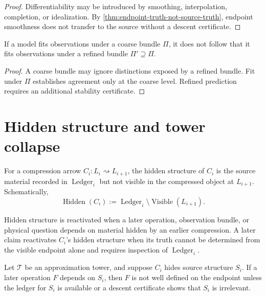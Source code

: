 \begin{proof}
Differentiability may be introduced by smoothing, interpolation, completion, or idealization. By \autoref{thm:endpoint-truth-not-source-truth}, endpoint smoothness does not transfer to the source without a descent certificate.
\end{proof}

\begin{corollary}
\label{cor:coarse-success-not-refined-prediction}
If a model fits observations under a coarse bundle $\Pi$, it does not follow that it fits observations under a refined bundle $\Pi'\supseteq\Pi$.
\end{corollary}

\begin{proof}
A coarse bundle may ignore distinctions exposed by a refined bundle. Fit under $\Pi$ establishes agreement only at the coarse level. Refined prediction requires an additional stability certificate.
\end{proof}

\section{Hidden structure and tower collapse}
\label{sec:hidden-structure-tower-collapse}

\begin{definition}
\label{def:tower-hidden-structure}
For a compression arrow $C_i:L_i\rightsquigarrow L_{i+1}$, the hidden structure of $C_i$ is the source material recorded in $\operatorname{Ledger}_i$ but not visible in the compressed object at $L_{i+1}$. Schematically,
$$
\operatorname{Hidden}(C_i)
:=
\operatorname{Ledger}_i
\setminus
\operatorname{Visible}(L_{i+1}).
$$
\end{definition}

\begin{definition}
\label{def:reactivation-hidden-structure}
Hidden structure is reactivated when a later operation, observation bundle, or physical question depends on material hidden by an earlier compression. A later claim reactivates $C_i$'s hidden structure when its truth cannot be determined from the visible endpoint alone and requires inspection of $\operatorname{Ledger}_i$.
\end{definition}

\begin{theorem}
\label{thm:tower-hidden-structure-active-later}
Let $\mathcal T$ be an approximation tower, and suppose $C_i$ hides source structure $S_i$. If a later operation $F$ depends on $S_i$, then $F$ is not well defined on the endpoint unless the ledger for $S_i$ is available or a descent certificate shows that $S_i$ is irrelevant.
\end{theorem}

